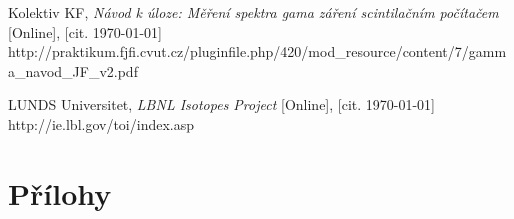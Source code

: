 \documentclass[english]{article}
\begin{document}
\begin{thebibliography}{9}
 Kolektiv KF, \emph{Návod k úloze: Měření spektra gama záření scintilačním počítačem} [Online], [cit. \today] \newline 
http://praktikum.fjfi.cvut.cz/pluginfile.php/420/mod\_resource/content/7/gamma\_navod\_JF\_v2.pdf

 LUNDS Universitet, \emph{LBNL Isotopes Project} [Online], [cit. \today] \newline http://ie.lbl.gov/toi/index.asp








\end{thebibliography}
\endgroup
\setcounter{equation}{0}
\clearpage
\part{Přílohy}
\end{document}
